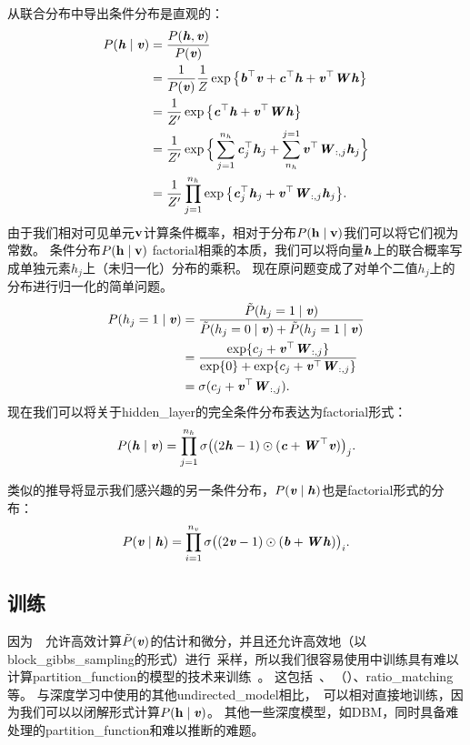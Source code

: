 从联合分布中导出条件分布是直观的：
\begin{align}
 P(\Vh \mid \Vv) &= \frac{P(\Vh, \Vv)}{P(\Vv)} \\
 &= \frac{1}{P(\Vv)} \frac{1}{Z} \exp \big\{ \Vb^\top \Vv + \Vc^\top \Vh + \Vv^\top\MW \Vh \big\} \\
 &=  \frac{1}{Z^\prime} \exp \big\{ \Vc^\top \Vh + \Vv^\top\MW \Vh \big\} \\
 &=  \frac{1}{Z^\prime} \exp \Big\{ \sum_{j=1}^{n_h}\Vc_j^\top \Vh_j 
 + \sum_{n_h}^{j=1} \Vv^\top\MW_{:,j} \Vh_j \Big\} \\
 &=  \frac{1}{Z^\prime} \prod_{j=1}^{n_h} \exp \big\{ \Vc_j^\top \Vh_j + \Vv^\top\MW_{:,j} \Vh_j \big\} .
\end{align}
由于我们相对可见单元$\RVv$计算条件概率，相对于分布$P(\RVh  \mid  \RVv)$我们可以将它们视为常数。
条件分布$ P(\RVh  \mid  \RVv) $ \gls{factorial}相乘的本质，我们可以将向量$\Vh$上的联合概率写成单独元素$h_j$上（未归一化）分布的乘积。
现在原问题变成了对单个二值$h_j$上的分布进行归一化的简单问题。
\begin{align}
 P(h_j=1  \mid  \Vv) &= \frac{\tilde{P}(h_j=1 \mid \Vv)}{\tilde{P}(h_j=0 \mid \Vv) + \tilde{P}(h_j=1 \mid \Vv)} \\
 &= \frac{\exp \{ c_j + \Vv^\top \MW_{:,j} \} }{\exp\{ 0 \} + \exp \{ c_j + \Vv^\top \MW_{:,j}\}} \\
 &= \sigma (c_j + \Vv^\top \MW_{:,j}).
\end{align}
现在我们可以将关于\gls{hidden_layer}的完全条件分布表达为\gls{factorial}形式：
\begin{align}
 P(\Vh  \mid  \Vv) = \prod_{j=1}^{n_h} \sigma \big( (2\Vh-1) \odot (\Vc + \MW^\top \Vv) \big)_j .
\end{align}

类似的推导将显示我们感兴趣的另一条件分布，$P(\Vv  \mid  \Vh)$也是\gls{factorial}形式的分布：
\begin{align}
  P(\Vv  \mid  \Vh) = \prod_{i=1}^{n_v} \sigma \big( (2\Vv-1) \odot (\Vb + \MW \Vh) \big)_i .
\end{align}


\subsection{训练}
\label{sec:training_restricted_boltzmann_machines}

因为~~允许高效计算$\tilde{P}(\Vv)$的估计和微分，并且还允许高效地（以\gls{block_gibbs_sampling}的形式）进行~采样，所以我们很容易使用中训练具有难以计算\gls{partition_function}的模型的技术来训练~。
这包括~、\,（）、\gls{ratio_matching}等。
与深度学习中使用的其他\gls{undirected_model}相比，~可以相对直接地训练，因为我们可以以闭解形式计算$P(\RVh  \mid  \Vv)$。
其他一些深度模型，如\gls{DBM}，同时具备难处理的\gls{partition_function}和难以推断的难题。

